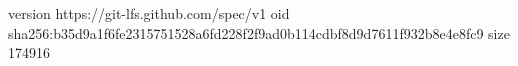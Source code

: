 version https://git-lfs.github.com/spec/v1
oid sha256:b35d9a1f6fe2315751528a6fd228f2f9ad0b114cdbf8d9d7611f932b8e4e8fc9
size 174916
